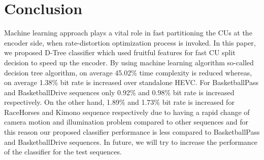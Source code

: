 \documentclass{article}
\begin{document}
\section{Conclusion}
\label{sec:Conclusion}
Machine learning approach plays a vital role in fast partitioning the CUs at the encoder side, when rate-distortion optimization process is invoked. In this paper, we proposed D-Tree classifier which used fruitful features for fast CU split decision to speed up the encoder. By using machine learning algorithm so-called decision tree algorithm, on average 45.02\% time complexity is reduced whereas, on average 1.38\% bit rate is increased over standalone HEVC. For BasketballPass and BasketballDrive sequences only 0.92\% and 0.98\% bit rate is increased respectively. On the other hand, 1.89\% and 1.73\% bit rate is increased for RaceHorses and Kimono sequence respectively due to having a rapid change of camera motion and illumination problem compared to other sequences and for this reason our proposed classifier performance is less compared to BasketballPass and BasketballDrive sequences. In future, we will try to increase the performance of the classifier for the test sequences.
 


\end{document}
